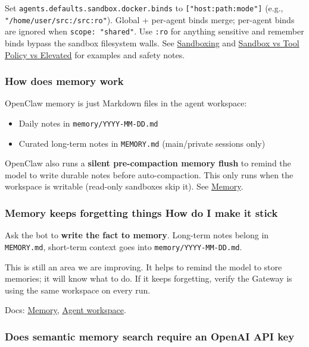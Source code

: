 Set \texttt{agents.defaults.sandbox.docker.binds} to \texttt{["host:path:mode"]} (e.g., \texttt{"/home/user/src:/src:ro"}). Global + per-agent binds merge; per-agent binds are ignored when \texttt{scope: "shared"}. Use \texttt{:ro} for anything sensitive and remember binds bypass the sandbox filesystem walls. See \href{/gateway/sandboxing\#custom-bind-mounts}{Sandboxing} and \href{/gateway/sandbox-vs-tool-policy-vs-elevated\#bind-mounts-security-quick-check}{Sandbox vs Tool Policy vs Elevated} for examples and safety notes.

\subsubsection{How does memory work}


OpenClaw memory is just Markdown files in the agent workspace:

\begin{itemize}
  \item Daily notes in \texttt{memory/YYYY-MM-DD.md}
  \item Curated long-term notes in \texttt{MEMORY.md} (main/private sessions only)
\end{itemize}


OpenClaw also runs a \textbf{silent pre-compaction memory flush} to remind the model
to write durable notes before auto-compaction. This only runs when the workspace
is writable (read-only sandboxes skip it). See \href{/concepts/memory}{Memory}.

\subsubsection{Memory keeps forgetting things How do I make it stick}


Ask the bot to \textbf{write the fact to memory}. Long-term notes belong in \texttt{MEMORY.md},
short-term context goes into \texttt{memory/YYYY-MM-DD.md}.

This is still an area we are improving. It helps to remind the model to store memories;
it will know what to do. If it keeps forgetting, verify the Gateway is using the same
workspace on every run.

Docs: \href{/concepts/memory}{Memory}, \href{/concepts/agent-workspace}{Agent workspace}.

\subsubsection{Does semantic memory search require an OpenAI API key}


